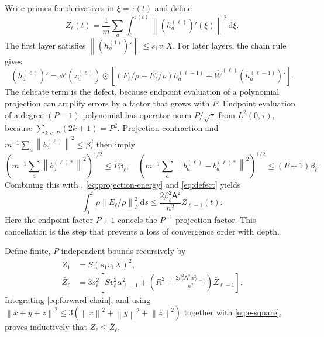 \documentclass[11pt]{article}
\theoremstyle{definition}
\theoremstyle{remark}
\newcommand{\norm}[1]{\left\lVert #1\right\rVert}
\newcommand{\od}{\mathbin{\odot}}
\newcommand{\dd}{\,\mathrm{d}}
\begin{document}
Write primes for derivatives in $\xi=\tau(t)$ and define
\[
 Z_\ell(t)=\frac1m\sum_a\int_0^{\tau(t)}
 \norm{(h_a^{(\ell)})'(\xi)}^2\dd\xi.
\]
The first layer satisfies $\norm{(h_a^{(1)})'}\le s_1v_1X$.  For later layers,
the chain rule gives
\begin{equation}
 (h_a^{(\ell)})'=\phi'(z_a^{(\ell)})\od
 \left[(F_\ell/\rho+E_\ell/\rho)h_a^{(\ell-1)}
 +\widehat W^{(\ell)}(h_a^{(\ell-1)})'\right].       \label{eq:forward-chain}
\end{equation}
The delicate term is the defect, because endpoint evaluation of a polynomial
projection can amplify errors by a factor that grows with $P$.  Endpoint
evaluation of a degree-$(P-1)$ polynomial has operator norm $P/\sqrt\tau$ from
$L^2(0,\tau)$, because $\sum_{k<P}(2k+1)=P^2$.  Projection contraction and
$m^{-1}\sum_a\norm{b^{(\ell)}_a}^2\le\beta_\ell^2$ then imply
\[
 \left(m^{-1}\sum_a\norm{b^{(\ell)*}_a}^2\right)^{1/2}\le P\beta_\ell,
 \quad
 \left(m^{-1}\sum_a\norm{b^{(\ell)}_a-b^{(\ell)*}_a}^2\right)^{1/2}
 \le(P+1)\beta_\ell.
\]
Combining this with , \eqref{eq:projection-energy} and
\eqref{eq:defect} yields
\begin{equation}
 \int_0^t\rho\norm{E_\ell/\rho}_F^2\dd s
 \le\frac{2\beta_\ell^2\mathsf A^2}{n^2}
 Z_{\ell-1}(t).                                      \label{eq:e-square}
\end{equation}
Here the endpoint factor $P+1$ cancels the $P^{-1}$ projection factor.  This
cancellation is the step that prevents a loss of convergence order with depth.

Define finite, $P$-independent bounds recursively by
\begin{align}
 \overline Z_1&=S(s_1v_1X)^2,\nonumber\\
 \overline Z_\ell&=3s_\ell^2\left[
 S v_\ell^2\alpha_{\ell-1}^2+
 \left(R^2+\frac{2\beta_\ell^2\mathsf A^2\alpha_{\ell-1}^2}{n^2}\right)
 \overline Z_{\ell-1}\right].                       \label{eq:z-recursion}
\end{align}
Integrating \eqref{eq:forward-chain}, and using
$\norm{x+y+z}^2\le3(\norm{x}^2+\norm{y}^2+\norm{z}^2)$ together with
\eqref{eq:e-square}, proves inductively that $Z_\ell\le\overline Z_\ell$.
\end{document}
